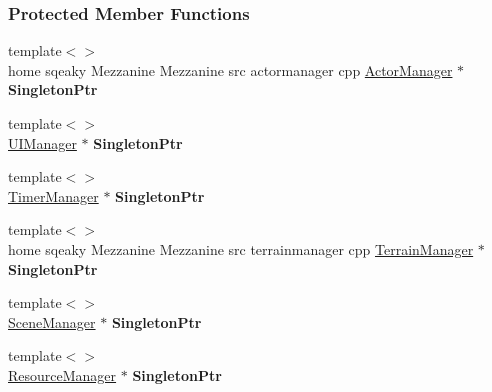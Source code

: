 \subsubsection*{Protected Member Functions}
\begin{DoxyCompactItemize}
\item 
\hypertarget{classMezzanine_1_1Singleton_acc82eb7ef63fd6ed2309244f80ca181c}{
{\footnotesize template$<$$>$ }\\home sqeaky Mezzanine Mezzanine src actormanager cpp \hyperlink{classMezzanine_1_1ActorManager}{ActorManager} $\ast$ {\bfseries SingletonPtr}}
\label{classMezzanine_1_1Singleton_acc82eb7ef63fd6ed2309244f80ca181c}

\item 
\hypertarget{classMezzanine_1_1Singleton_a3e2d258d97c4686df2a0025987148824}{
{\footnotesize template$<$$>$ }\\\hyperlink{classMezzanine_1_1UIManager}{UIManager} $\ast$ {\bfseries SingletonPtr}}
\label{classMezzanine_1_1Singleton_a3e2d258d97c4686df2a0025987148824}

\item 
\hypertarget{classMezzanine_1_1Singleton_a418516c1ec4ebe5a76f1c0a7a65b5b13}{
{\footnotesize template$<$$>$ }\\\hyperlink{classMezzanine_1_1TimerManager}{TimerManager} $\ast$ {\bfseries SingletonPtr}}
\label{classMezzanine_1_1Singleton_a418516c1ec4ebe5a76f1c0a7a65b5b13}

\item 
\hypertarget{classMezzanine_1_1Singleton_a46e979f22cdf71ac1ff1fa664fdd0013}{
{\footnotesize template$<$$>$ }\\home sqeaky Mezzanine Mezzanine src terrainmanager cpp \hyperlink{classMezzanine_1_1TerrainManager}{TerrainManager} $\ast$ {\bfseries SingletonPtr}}
\label{classMezzanine_1_1Singleton_a46e979f22cdf71ac1ff1fa664fdd0013}

\item 
\hypertarget{classMezzanine_1_1Singleton_a11e9a146c4058601d4a9fe8d83fd61a2}{
{\footnotesize template$<$$>$ }\\\hyperlink{classMezzanine_1_1SceneManager}{SceneManager} $\ast$ {\bfseries SingletonPtr}}
\label{classMezzanine_1_1Singleton_a11e9a146c4058601d4a9fe8d83fd61a2}

\item 
\hypertarget{classMezzanine_1_1Singleton_a137ae0a32a54dd2683caa05b772b9c52}{
{\footnotesize template$<$$>$ }\\\hyperlink{classMezzanine_1_1ResourceManager}{ResourceManager} $\ast$ {\bfseries SingletonPtr}}
\label{classMezzanine_1_1Singleton_a137ae0a32a54dd2683caa05b772b9c52}


\end{DoxyCompactItemize}
